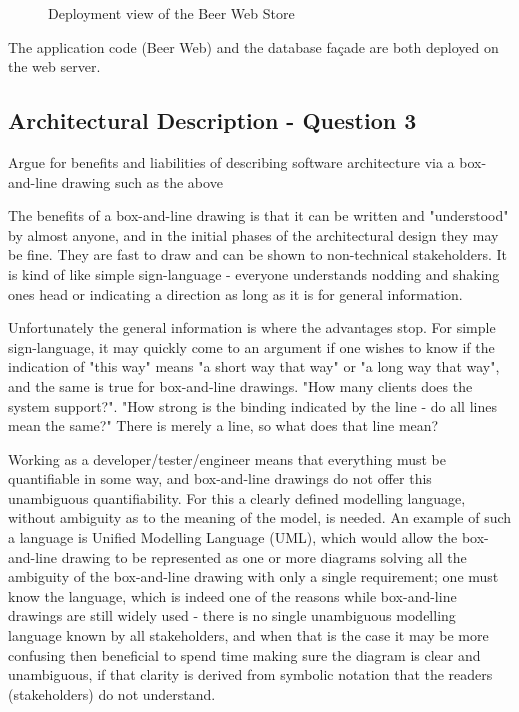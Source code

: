 \begin{figure}[!htb]
\centerline{}
\caption{Deployment view of the Beer Web Store}
\label{fig:ad_allocation}
\end{figure}

The application code (Beer Web) and the database fa\c cade are
both deployed on the web server.

\subsection{Architectural Description - Question 3}

\begin{question}
Argue for benefits and liabilities of describing software
architecture via a box-and-line drawing such as the above
\end{question}

The benefits of a box-and-line drawing is that it can be written and "understood" by almost anyone, and in the initial phases of the architectural design they may be fine. They are fast to draw and can be shown to non-technical stakeholders. It is kind of like simple sign-language - everyone understands nodding and shaking ones head or indicating a direction as long as it is for general information.

Unfortunately the general information is where the advantages stop. For simple sign-language, it may quickly come to an argument if one wishes to know if the indication of "this way" means "a short way that way" or "a long way that way", and the same is true for box-and-line drawings. "How many clients does the system support?". "How strong is the binding indicated by the line - do all lines mean the same?" There is merely a line, so what does that line mean?

Working as a developer/tester/engineer means that everything must be quantifiable in some way, and box-and-line drawings do not offer this unambiguous quantifiability. For this a clearly defined modelling language, without ambiguity as to the meaning of the model, is needed. An example of such a language is Unified Modelling Language (UML), which would allow the box-and-line drawing to be represented as one or more diagrams solving all the ambiguity of the box-and-line drawing with only a single requirement; one must know the language, which is indeed one of the reasons while box-and-line drawings are still widely used - there is no single unambiguous modelling language known by all stakeholders, and when that is the case it may be more confusing then beneficial to spend time making sure the diagram is clear and unambiguous, if that clarity is derived from symbolic notation that the readers (stakeholders) do not understand.

